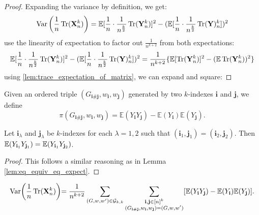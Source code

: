 \begin{proof}
    \notready
    Expanding the variance by definition, we get:
    $$
    \operatorname{Var}\left(\frac{1}{n}\operatorname{Tr}(\mathbf{X}_{n}^{k})\right) = \mathbb{E}[\frac{1}{n} \cdot \frac{1}{n^{\frac{k}{2}}} \operatorname{Tr}(\mathbf{Y}_{n}^{k})]^2 - (\mathbb{E}[\frac{1}{n}\cdot \frac{1}{n^{\frac{k}{2}}} \operatorname{Tr}(\mathbf{Y})_{n}^{k}])^2
    $$
    use the linearity of expectation to factor out $\frac{1}{n^{k+2}}$ from both expectations:
    $$
    \mathbb{E}[\frac{1}{n} \cdot \frac{1}{n^{\frac{k}{2}}} \operatorname{Tr}(\mathbf{Y}_{n}^{k})]^2 - (\mathbb{E}[\frac{1}{n}\cdot \frac{1}{n^{\frac{k}{2}}} \operatorname{Tr}(\mathbf{Y})_{n}^{k}])^2 = \frac{1}{n^{k+2}} \{\mathbb{E}[\operatorname{Tr}(\mathbf{Y}_{n}^{k})]^2 - (\mathbb{E} \operatorname{Tr}(\mathbf{Y}_{n}^{k}))^2\}
    $$
    using \ref{lem:trace_expectation_of_matrix}, we can expand and square:
\end{proof}


\begin{definition}
  \notready
  \label{def:common_val_prod_of}
  Given an ordered triple $(G_{\mathbf{i}\#\mathbf{j}},w_\mathbf{i},w_\mathbf{j})$ generated by two $k$-indexes $\mathbf{i}$ and $\mathbf{j}$, we define
  \[
  \pi(G_{\mathbf{i}\#\mathbf{j}},w_\mathbf{i},w_\mathbf{j}) = \mathbb{E}(Y_\mathbf{i} Y_\mathbf{j}) - \mathbb{E}(Y_\mathbf{i}) \mathbb{E}(Y_\mathbf{j}).
  \]
\end{definition}


\begin{lemma}
  \notready
  \label{lem:common_val_eq_of_index_pair_rel}
  Let $\mathbf{i}_\lambda$ and $\mathbf{j}_\lambda$ be $k$-indexes for each $\lambda=1,2$ such that $(\mathbf{i}_1,\mathbf{j}_1) = (\mathbf{i}_2,\mathbf{j}_2)$.
  Then $\mathbb{E} (Y_{\mathbf{i}_1}Y_{\mathbf{j}_1}) = \mathbb{E} (Y_{\mathbf{i}_1}Y_{\mathbf{j}_2})$.
\end{lemma}

\begin{proof}
  This follows a similar reasoning as in Lemma \ref{lem:eq_equiv_eq_expect}.
\end{proof}


\begin{lemma}
  \notready
  \label{lem:sum_eq_sum_over_classes}
  \[
  \text{Var} \biggl(\frac{1}{n} \operatorname{Tr} (\mathbf{X}_n^k) \biggl)
  = \frac{1}{n^{k+2}} \sum_{(G,w,w') \in \mathcal{G}_{k,k}} \sum_{\substack{\mathbf{i},\mathbf{j} \in [n]^k \\ (G_{\mathbf{i}\#\mathbf{j}},w_\mathbf{i},w_\mathbf{j}) = (G,w,w')}} [\mathbb{E}(Y_\mathbf{i} Y_\mathbf{j}) - \mathbb{E}(Y_\mathbf{i}) \mathbb{E}(Y_\mathbf{j})].
  \]
\end{lemma}

